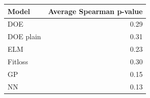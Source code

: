 \begin{tabular}{lr}
\toprule
Model & Average Spearman p-value \\
\midrule
DOE & 0.29 \\
DOE plain & 0.31 \\
ELM & 0.23 \\
Fitloss & 0.30 \\
GP & 0.15 \\
NN & 0.13 \\
\bottomrule
\end{tabular}
